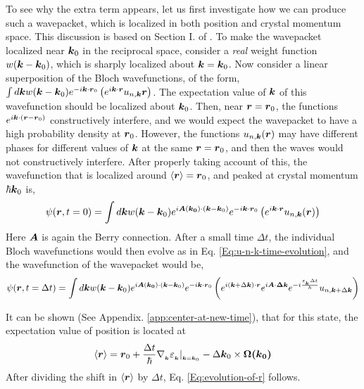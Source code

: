 \documentclass{revtex4-2}
\renewcommand\vec[1]{\ensuremath\boldsymbol{#1}} %
\begin{document}
To see why the extra term appears, let us first investigate how we can produce such a wavepacket, which is localized in both position and crystal momentum space. This discussion is based on Section I. of \cite{ralph2020berry}. To make the wavepacket localized near $\vec{k}_0$ in the reciprocal space, consider a \textit{real} weight function $w(\vec{k} - \vec{k}_0)$, which is sharply localized about $\vec{k} = \vec{k}_0$. Now consider a linear superposition of the Bloch wavefunctions, of the form, $\int d\vec{k} w(\vec{k} - \vec{k}_0) e^{-i \vec{k} \cdot \vec{r}_0 } \left(e^{i \vec{k} \cdot\vec{r}} u_{n,\vec{k}}\vec{r}\right)$. The expectation value of $\vec{k}$ of this wavefunction should be localized about $\vec{k}_0$. Then, near $\vec{r} = \vec{r}_0$, the functions $e^{i \vec{k} \cdot (\vec{r} -\vec{r}_0 )}$ constructively interfere, and we would expect the wavepacket to have a high probability density at $\vec{r}_0$. However, the functions $u_{n,\vec{k}}(\vec{r})$ may have different phases for different values of $\vec{k}$ at the same $\vec{r} = \vec{r}_0$, and then the waves would not constructively interfere.
After properly taking account of this, the wavefunction that is localized around $\expval{\vec{r}} = \vec{r}_0$, and peaked at crystal momentum $\hbar \vec{k}_0$ is,
$$\psi(\vec{r}, t=0) = \int d\vec{k} w(\vec{k} - \vec{k}_0) e^{i \vec{A}(\vec{k_0})\cdot (\vec{k} - \vec{k}_0)} e^{-i \vec{k} \cdot \vec{r}_0 } \left(e^{i \vec{k} \cdot\vec{r}} u_{n,\vec{k}}(\vec{r})\right)$$
Here $\vec{A}$ is again the Berry connection. After a small time $\Delta t$, the individual Bloch wavefunctions would then evolve as in Eq. \eqref{Eq:u-n-k-time-evolution}, and the wavefunction of the wavepacket would be,
$$\psi(\vec{r}, t=\Delta t) = \int d\vec{k} w(\vec{k} - \vec{k}_0) e^{i \vec{A}(\vec{k_0})\cdot (\vec{k} - \vec{k}_0)} e^{-i \vec{k} \cdot \vec{r}_0 } \left(e^{i (\vec{k} + \Delta\vec{k})\cdot\vec{r}} e^{i \vec{A}\cdot \vec{\Delta{k}}} e^{-i \frac{\varepsilon_{_{\vec{k}}} \Delta t}{\hbar}} u_{n, \vec{k}+\Delta \vec{k}} \right)$$

It can be shown (See Appendix. \ref{app:center-at-new-time}), that for this state, the expectation value of position is located at
$$\langle \vec{r} \rangle = \vec{r}_0 +  \frac{\Delta t}{\hbar} \nabla{_{_{\vec{k}}}} \varepsilon_{_{\vec{k}}}|_{_{\vec{k} = \vec{k}_0}} - \Delta \vec{k}_0 \times \vec{\Omega(\vec{k}_0)}$$
After dividing the shift in $\langle{\vec{r}}\rangle$ by $\Delta t$, Eq. \eqref{Eq:evolution-of-r} follows.
\end{document}
